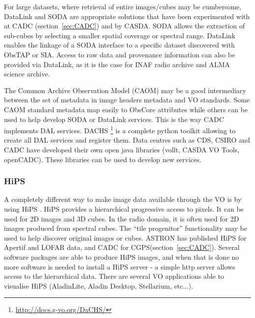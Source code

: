 \documentclass[11pt,a4paper]{ivoa}
\begin{document}
For large datasets, where retrieval of entire images/cubes may be cumbersome,  DataLink and SODA are 
appropriate solutions that have been experimented with at CADC (section~\ref{sec:CADC}) and by CASDA. 
SODA allows the extraction of sub-cubes by selecting a smaller spatial coverage or spectral range. 
DataLink enables the linkage of a SODA interface to a specific dataset discovered with ObsTAP or SIA. 
Access to raw data and provenance information can also be provided via DataLink, as it is the case for 
INAF radio archive and ALMA science archive.

The Common Archive Observation Model (CAOM) may be a good intermediary between the set of metadata in 
image headers metadata and VO standards. Some CAOM standard metadata map easily to ObsCore attributes 
while others can be used to help develop SODA or DataLink services. This is the way CADC implements DAL 
services. DACHS \footnote{\url{http://docs.g-vo.org/DaCHS/}} is a complete python toolkit allowing to 
create all DAL services and register them. Data centres such as CDS, CSIRO and CADC have developed their 
own open java libraries (vollt, CASDA VO Tools, openCADC). These libraries can be used to develop new 
services.


\subsubsection{HiPS}
A completely different way to make image data available through the VO is by using HiPS 
\citep{2017ivoa.spec.0519F}. HiPS provides a hierarchical progressive access to pixels. It can be used 
for 2D images and 3D cubes. In the radio domain, it is often used for 2D images produced from spectral 
cubes. The ``tile progenitor''  functionality may be used to help discover original images or cubes. 
ASTRON has published HiPS for Apertif and LOFAR data, and CADC for CGPS(section~\ref{sec:CADC}). Several 
software packages are able to produce HiPS images, and when that is done no more software is needed to 
install a HiPS server - a simple http server allows access to the hierarchical data. There are several 
VO applications able to visualise HiPS (AladinLite, Aladin Desktop, Stellarium, etc...). 
\end{document}
